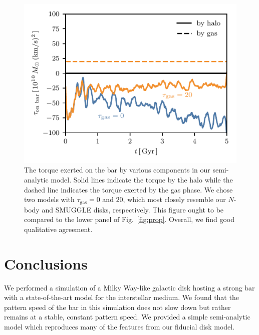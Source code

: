\documentclass[twocolumn,linenumbers,trackchanges]{aastex631}
\newcommand{\SMUGGLE}{SMUGGLE}
\begin{document}
\begin{figure}
    \centering
    \includegraphics[width=\columnwidth]{fig/sam_torque.pdf}
    \caption{The torque exerted on the bar by various components in our
    semi-analytic model. Solid lines indicate the torque by the halo while the
    dashed line indicates the torque exerted by the gas phase. We chose two
    models with $\tau_{\textrm{gas}}=0$ and $20$, which most closely resemble
    our $N$-body and \SMUGGLE{} disks, respectively. This figure ought to be
    compared to the lower panel of Fig.~\ref{fig:prop}. Overall, we find good
    qualitative agreement.}
    \label{fig:sam-torque}
\end{figure}

\section{Conclusions}
\label{sec:conclusions}
We performed a simulation of a Milky Way-like galactic disk hosting a strong bar
with a state-of-the-art model for the interstellar medium. We found that the
pattern speed of the bar in this simulation does not slow down but rather
remains at a stable, constant pattern speed. We provided a simple semi-analytic
model which reproduces many of the features from our fiducial disk model.
\end{document}
